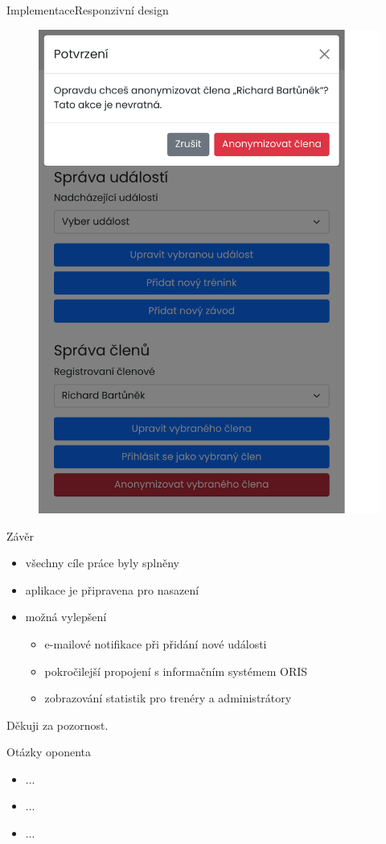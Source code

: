 \documentclass[aspectratio=169]{beamer}
\begin{document}
\begin{frame}{Implementace}{Responzivní design}
\begin{figure}[h]
\begin{minipage}[b]{0.3\linewidth}
            \includegraphics[width=0.9\linewidth, cfbox=confirm-gray 0.5pt 0pt]{images/confirm-dialog.pdf}
        \end{minipage}
        \hfill
    \end{figure}
\end{frame}

\begin{frame}{Závěr}
    \begin{itemize}
        \item všechny cíle práce byly splněny
        \item aplikace je připravena pro nasazení
        \item možná vylepšení
        \begin{itemize}
            \item e-mailové notifikace při přidání nové události
            \item pokročilejší propojení s informačním systémem ORIS
            \item zobrazování statistik pro trenéry a administrátory
        \end{itemize}
    \end{itemize}
\end{frame}

\begin{frame}
    Děkuji za pozornost.
\end{frame}

\appendix

\begin{frame}{Otázky oponenta}
    \begin{itemize}
        \item ...
        \item ...
        \item ...
    \end{itemize}
\end{frame}
\end{document}
